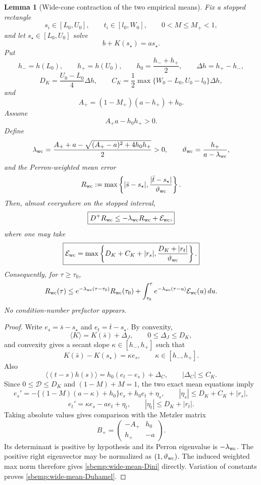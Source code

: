 \documentclass{article} %
\theoremstyle{plain}
\newtheorem{lemma}[theorem]{Lemma}
\theoremstyle{definition}
\theoremstyle{remark}
\begin{document}
\begin{lemma}[Wide-cone contraction of the two empirical means]
\label{sbemp:wide-mean-contraction}
Fix a stopped rectangle
\[
 s_i\in[L_0,U_0],\qquad t_i\in[l_0,W_0],\qquad 0<M\le M_+<1,
\]
and let $s_\star\in[L_0,U_0]$ solve
\[
 b+K(s_\star)=a s_\star.
\]
Put
\[
 h_-=h(L_0),\qquad h_+=h(U_0),\qquad
 h_0=\frac{h_-+h_+}{2},\qquad \Delta h=h_+-h_-,
\]
\[
 D_K=\frac{U_0-L_0}{4}\Delta h,\qquad
 C_K=\frac12\max\{W_0-L_0,U_0-l_0\}\Delta h,
\]
and
\[
 A_+=(1-M_+)(a-h_+)+h_0.
\]
Assume
\[
 A_+a-h_0h_+>0.
\]
Define
\[
 \lambda_{\rm wc}
 =\frac{A_++a-\sqrt{(A_+-a)^2+4h_0h_+}}{2}>0,
 \qquad
 \vartheta_{\rm wc}=\frac{h_+}{a-\lambda_{\rm wc}},
\]
and the Perron-weighted mean error
\[
 R_{\rm wc}
 :=\max\left\{
 |\bar s-s_\star|,
 \frac{|\bar t-s_\star|}{\vartheta_{\rm wc}}
 \right\}.
\]
Then, almost everywhere on the stopped interval,
\begin{equation}\label{sbemp:wide-mean-Dini}
 \boxed{
 D^+R_{\rm wc}
 \le-\lambda_{\rm wc}R_{\rm wc}+\mathcal E_{\rm wc},
 }
\end{equation}
where one may take
\[
 \boxed{
 \mathcal E_{\rm wc}
 =\max\left\{
 D_K+C_K+|r_s|,
 \frac{D_K+|r_t|}{\vartheta_{\rm wc}}
 \right\}.
 }
\]
Consequently, for $\tau\ge\tau_0$,
\begin{equation}\label{sbemp:wide-mean-Duhamel}
 R_{\rm wc}(\tau)
 \le e^{-\lambda_{\rm wc}(\tau-\tau_0)}R_{\rm wc}(\tau_0)
 +\int_{\tau_0}^{\tau}
 e^{-\lambda_{\rm wc}(\tau-u)}\mathcal E_{\rm wc}(u)\,du.
\end{equation}
No condition-number prefactor appears.
\end{lemma}
\begin{proof}
Write $e_s=\bar s-s_\star$ and $e_t=\bar t-s_\star$.  By convexity,
\[
 \langle K\rangle=K(\bar s)+\Delta_J,
 \qquad 0\le\Delta_J\le D_K,
\]
and convexity gives a secant slope $\kappa\in[h_-,h_+]$ such that
\[
 K(\bar s)-K(s_\star)=\kappa e_s,
 \qquad \kappa\in[h_-,h_+].
\]
Also
\[
 \langle(t-s)h(s)\rangle
 =h_0(e_t-e_s)+\Delta_C,
 \qquad |\Delta_C|\le C_K.
\]
Since $0\le\mathcal D\le D_K$ and
$(1-M)+M=1$, the two exact mean equations imply
\[
 e_s'
 =-\{(1-M)(a-\kappa)+h_0\}e_s+h_0e_t+\eta_s,
 \qquad |\eta_s|\le D_K+C_K+|r_s|,
\]
\[
 e_t'=\kappa e_s-ae_t+\eta_t,
 \qquad |\eta_t|\le D_K+|r_t|.
\]
Taking absolute values gives comparison with the Metzler matrix
\[
 B_+=
 \begin{pmatrix}
 -A_+&h_0\\ h_+&-a
 \end{pmatrix}.
\]
Its determinant is positive by hypothesis and its Perron eigenvalue is
$-\lambda_{\rm wc}$.  The positive right eigenvector may be normalized as
$(1,\vartheta_{\rm wc})$.  The induced weighted max norm therefore gives
\eqref{sbemp:wide-mean-Dini} directly.  Variation of constants proves
\eqref{sbemp:wide-mean-Duhamel}.
\end{proof}
\end{document}
